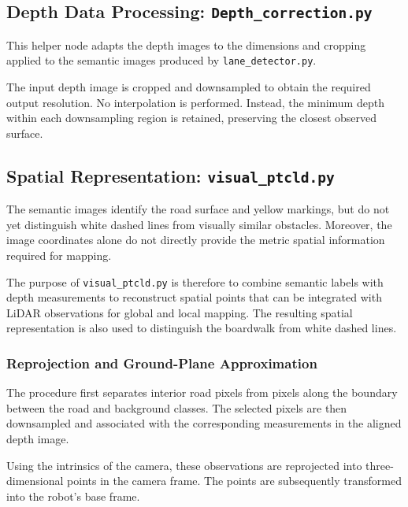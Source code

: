 \documentclass[a4paper,11pt,oneside]{book}
\begin{document}
\subsection{Depth Data Processing: \texttt{Depth\_correction.py}}
\label{subsec:depth_correction}

This helper node adapts the depth images to the dimensions and
cropping applied to the semantic images produced by
\texttt{lane\_detector.py}.

The input depth image is cropped and downsampled to obtain the
required output resolution. No interpolation is performed.
Instead, the minimum depth within each downsampling region is
retained, preserving the closest observed surface.


\subsection{Spatial Representation: \texttt{visual\_ptcld.py}}
\label{subsec:visual_ptcld}

The semantic images identify the road surface and yellow markings,
but do not yet distinguish white dashed lines from visually similar
obstacles. Moreover, the image coordinates alone do not directly
provide the metric spatial information required for mapping.

The purpose of \texttt{visual\_ptcld.py} is therefore to combine
semantic labels with depth measurements to reconstruct spatial
points that can be integrated with LiDAR observations for global
and local mapping. The resulting spatial representation is also
used to distinguish the boardwalk from white dashed lines.

\subsubsection{Reprojection and Ground-Plane Approximation}

The procedure first separates interior road pixels from pixels
along the boundary between the road and background classes.
The selected pixels are then downsampled and associated with
the corresponding measurements in the aligned depth image.

Using the intrinsics of the camera, these observations are reprojected
into three-dimensional points in the camera frame. The points
are subsequently transformed into the robot's base frame.
\end{document}
